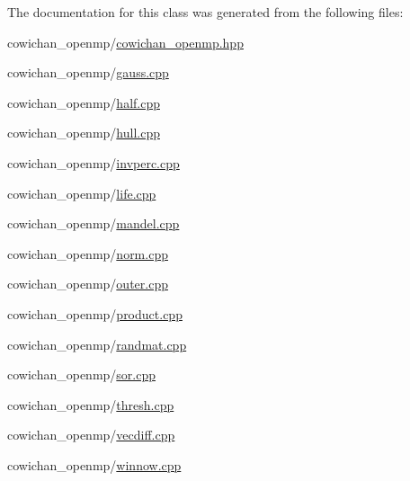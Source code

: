 The documentation for this class was generated from the following files:\begin{CompactItemize}
\item 
cowichan\_\-openmp/\hyperlink{cowichan__openmp_8hpp}{cowichan\_\-openmp.hpp}\item 
cowichan\_\-openmp/\hyperlink{cowichan__openmp_2gauss_8cpp}{gauss.cpp}\item 
cowichan\_\-openmp/\hyperlink{cowichan__openmp_2half_8cpp}{half.cpp}\item 
cowichan\_\-openmp/\hyperlink{cowichan__openmp_2hull_8cpp}{hull.cpp}\item 
cowichan\_\-openmp/\hyperlink{cowichan__openmp_2invperc_8cpp}{invperc.cpp}\item 
cowichan\_\-openmp/\hyperlink{cowichan__openmp_2life_8cpp}{life.cpp}\item 
cowichan\_\-openmp/\hyperlink{cowichan__openmp_2mandel_8cpp}{mandel.cpp}\item 
cowichan\_\-openmp/\hyperlink{cowichan__openmp_2norm_8cpp}{norm.cpp}\item 
cowichan\_\-openmp/\hyperlink{cowichan__openmp_2outer_8cpp}{outer.cpp}\item 
cowichan\_\-openmp/\hyperlink{cowichan__openmp_2product_8cpp}{product.cpp}\item 
cowichan\_\-openmp/\hyperlink{cowichan__openmp_2randmat_8cpp}{randmat.cpp}\item 
cowichan\_\-openmp/\hyperlink{cowichan__openmp_2sor_8cpp}{sor.cpp}\item 
cowichan\_\-openmp/\hyperlink{cowichan__openmp_2thresh_8cpp}{thresh.cpp}\item 
cowichan\_\-openmp/\hyperlink{cowichan__openmp_2vecdiff_8cpp}{vecdiff.cpp}\item 
cowichan\_\-openmp/\hyperlink{cowichan__openmp_2winnow_8cpp}{winnow.cpp}\end{CompactItemize}

